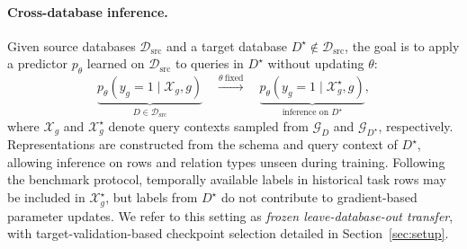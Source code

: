 \paragraph{Cross-database inference.}
Given source databases $\mathcal D_{\mathrm{src}}$ and a target database
$D^\star\notin\mathcal D_{\mathrm{src}}$, the goal is to apply a predictor
$p_\theta$ learned on $\mathcal D_{\mathrm{src}}$ to queries in $D^\star$
without updating $\theta$:
\begin{equation}
 \underbrace{p_\theta\!\left(y_g=1\mid\mathcal X_g,g\right)}
 _{D\in\mathcal D_{\mathrm{src}}}
 \quad\xrightarrow{\theta\ \text{fixed}}\quad
 \underbrace{p_\theta\!\left(y_g=1\mid\mathcal X_g^\star,g\right)}
 _{\text{inference on }D^\star},
 \label{eq:cross_database_transfer}
\end{equation}
where $\mathcal X_g$ and $\mathcal X_g^\star$ denote query contexts sampled
from $\mathcal G_D$ and $\mathcal G_{D^\star}$, respectively.
Representations are constructed from
the schema and query context of $D^\star$, allowing inference on rows and
relation types unseen during training.
Following the benchmark protocol, temporally available labels in historical
task rows may be included in $\mathcal X_g^\star$, but labels from $D^\star$
do not contribute to gradient-based parameter updates.
We refer to this setting as \emph{frozen leave-database-out transfer},
with target-validation-based checkpoint selection detailed in
Section~\ref{sec:setup}.